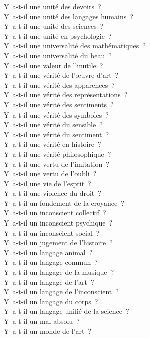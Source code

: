 \documentclass[a4paper,12pt]{article}
\begin{document}
Y a-t-il une unité des devoirs ? \\
Y a-t-il une unité des langages humains ? \\
Y a-t-il une unité des sciences ? \\
Y a-t-il une unité en psychologie ? \\
Y a-t-il une universalité des mathématiques ? \\
Y a-t-il une universalité du beau ? \\
Y a-t-il une valeur de l'inutile ? \\
Y a-t-il une vérité de l'œuvre d'art ? \\
Y a-t-il une vérité des apparences ? \\
Y a-t-il une vérité des représentations ? \\
Y a-t-il une vérité des sentiments ? \\
Y a-t-il une vérité des symboles ? \\
Y a-t-il une vérité du sensible ? \\
Y a-t-il une vérité du sentiment ? \\
Y a-t-il une vérité en histoire ? \\
Y a-t-il une vérité philosophique ? \\
Y a-t-il une vertu de l'imitation ? \\
Y a-t-il une vertu de l'oubli ? \\
Y a-t-il une vie de l'esprit ? \\
Y a-t-il une violence du droit ? \\
Y a-t-il un fondement de la croyance ? \\
Y a-t-il un inconscient collectif ? \\
Y a-t-il un inconscient psychique ? \\
Y a-t-il un inconscient social ? \\
Y a-t-il un jugement de l'histoire ? \\
Y a-t-il un langage animal ? \\
Y a-t-il un langage commun ? \\
Y a-t-il un langage de la musique ? \\
Y a-t-il un langage de l'art ? \\
Y a-t-il un langage de l'inconscient ? \\
Y a-t-il un langage du corps ? \\
Y a-t-il un langage unifié de la science ? \\
Y a-t-il un mal absolu ? \\
Y a-t-il un monde de l'art ? \\
\end{document}

